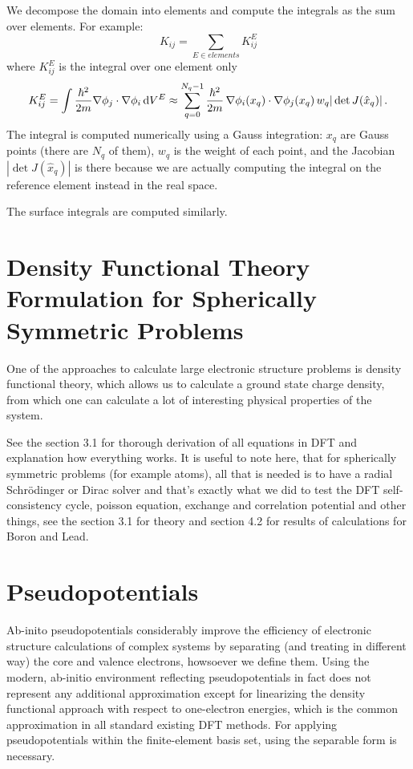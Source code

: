 We decompose the domain into elements and compute the integrals as the sum over elements. For example: 
\begin{equation*}
  K_{ij}=\sum_{E\in elements} K_{ij}^E
\end{equation*}
where $K_{ij}^E$ is the integral over one element only 
\begin{equation*}
  K_{ij}^{E}=\int{\hbar^2\over2m}\nabla\phi_j\cdot\nabla\phi_i\,{\rm d} V^{E}\approx \sum_{q=0}^{N_q-1}{\hbar^2\over2m}\,\nabla\phi_i(x_q)\cdot\nabla\phi_j(x_q)\, w_q|\det J(\hat x_q)|\,.
\end{equation*}
The integral is computed numerically using a Gauss integration: $x_q$ are Gauss points (there are $N_q$ of them), $w_q$ is the weight of each point, and the Jacobian $|\det J(\hat x_q)|$ is there because we are actually computing the integral on the reference element instead in the real space.

The surface integrals are computed similarly.


\section{Density Functional Theory Formulation for Spherically Symmetric
Problems}

One of the approaches to calculate large electronic structure problems is
density functional theory, which allows us to calculate a ground state charge
density, from which one can calculate a lot of interesting physical properties
of the system.

See the section 3.1 for thorough derivation of all equations in DFT and
explanation how everything works. It is useful to note here, that for
spherically symmetric problems (for example atoms), all that is needed is
to have a radial Schr\"odinger or Dirac solver and that's exactly what we did
to test the DFT self-consistency cycle, poisson equation, exchange and
correlation potential and other things, see the section 3.1 for theory and
section 4.2 for results of calculations for Boron and Lead.

\section{Pseudopotentials}

Ab-inito pseudopotentials \cite{pickett} considerably improve the efficiency of
electronic structure calculations of complex systems by separating (and
treating in different way) the core and valence electrons, howsoever we define
them.  Using the modern, ab-initio environment reflecting pseudopotentials
\cite{vackarAEPP2} in fact does not represent any additional approximation
except for linearizing the density functional approach with respect to
one-electron energies, which is the common approximation in all standard
existing DFT methods.  For applying pseudopotentials within the finite-element
basis set, using the separable form is necessary.

